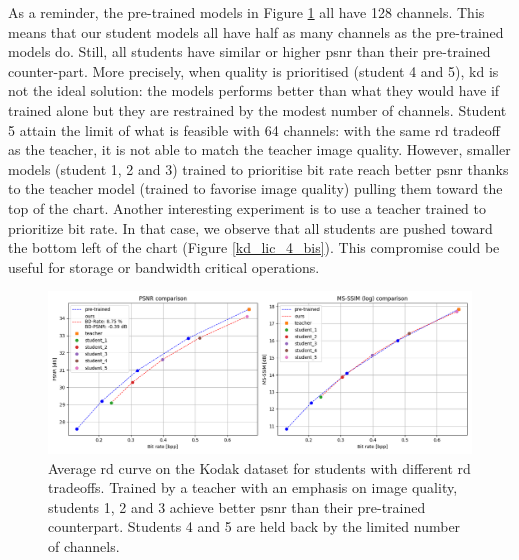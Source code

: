 As a reminder, the pre-trained models in Figure \ref{kd_lic_4} all have 128 channels. This means that our student models all have half as many channels as the pre-trained models do. Still, all students have similar or higher \acrshort{psnr} than their pre-trained counter-part. More precisely, when quality is prioritised (student 4 and 5), \acrshort{kd} is not the ideal solution: the models performs better than what they would have if trained alone but they are restrained by the modest number of channels. Student 5 attain the limit of what is feasible with 64 channels: with the same \acrshort{rd} tradeoff as the teacher, it is not able to match the teacher image quality. However, smaller models (student 1, 2 and 3) trained to prioritise bit rate reach better \acrshort{psnr} thanks to the teacher model (trained to favorise image quality) pulling them toward the top of the chart. Another interesting experiment is to use a teacher trained to prioritize bit rate. In that case, we observe that all students are pushed toward the bottom left of the chart (Figure \ref{kd_lic_4_bis}). This compromise could be useful for storage or bandwidth critical operations.

\begin{figure}
    \centering
    \includegraphics[width=15cm]{../img/kd_lic_rd_lambda_1.png}
    \caption[Average \acrshort{rd} curve on the Kodak dataset for students with different \acrshort{rd} tradeoffs.]{Average \acrshort{rd} curve on the Kodak dataset for students with different \acrshort{rd} tradeoffs. Trained by a teacher with an emphasis on image quality, students 1, 2 and 3 achieve better \acrshort{psnr} than their pre-trained counterpart. Students 4 and 5 are held back by the limited number of channels.}
    \label{kd_lic_4}
\end{figure}

